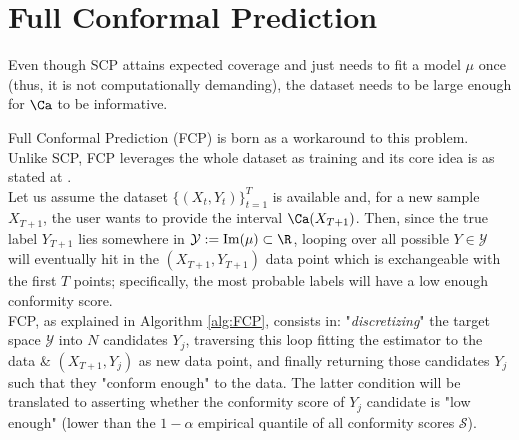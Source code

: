 \section{Full Conformal Prediction}\label{sec:fcp}

Even though SCP attains expected coverage and just needs to fit a model $\mu$ once (thus, it is not computationally demanding), the dataset needs to be large enough for $\Ca$ to be informative. 

Full Conformal Prediction (FCP) is born as a workaround to this problem. Unlike SCP, FCP leverages the whole dataset as training and its core idea is as stated at \cite{gentleintro}.\\

Let us assume the dataset $\{(X_t, Y_t)\}_{t=1}^{T}$ is available and, for a new sample $X_{T+1}$, the user wants to provide the interval $\Ca(X_{T+1})$. Then, since the true label $Y_{T+1}$ lies somewhere in $\mathcal{Y} := \mathrm{Im}(\mu)\subset\R$, looping over all possible $Y\in\mathcal{Y}$ will eventually hit in the $(X_{T+1}, Y_{T+1})$ data point which is exchangeable with the first $T$ points; specifically, the most probable labels will have a low enough conformity score.\\

FCP, as explained in Algorithm \ref{alg:FCP}, consists in: "\textit{discretizing}" the target space $\mathcal{Y}$ into $N$ candidates $Y_j$, traversing this loop fitting the estimator to the data \& $(X_{T+1},Y_{j})$ as new data point, and finally returning those candidates $Y_{j}$ such that they "conform enough" to the data. The latter condition will be translated to asserting whether the conformity score of $Y_{j}$ candidate is "low enough" (lower than the $1-\alpha$ empirical quantile of all conformity scores $\mathcal{S}$).\\

